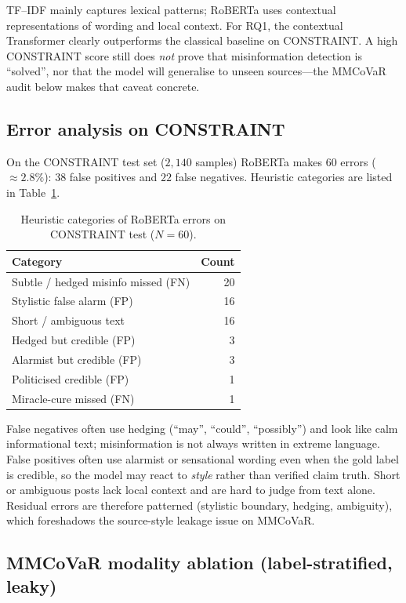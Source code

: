 \documentclass[12pt, a4paper]{report}
\begin{document}
TF--IDF mainly captures lexical patterns; RoBERTa uses contextual representations of wording and local context.
For RQ1, the contextual Transformer clearly outperforms the classical baseline on CONSTRAINT.
A high CONSTRAINT score still does \emph{not} prove that misinformation detection is ``solved'', nor that the model will generalise to unseen sources---the MMCoVaR audit below makes that caveat concrete.

\subsection{Error analysis on CONSTRAINT}

On the CONSTRAINT test set ($2{,}140$ samples) RoBERTa makes $60$ errors ($\approx 2.8\%$): $38$ false positives and $22$ false negatives.
Heuristic categories are listed in Table~\ref{tab:error-cats}.

\begin{table}[htbp]
\centering
\caption{Heuristic categories of RoBERTa errors on CONSTRAINT test ($N=60$).}
\label{tab:error-cats}
\begin{tabular}{lr}
\hline
Category & Count \\
\hline
Subtle / hedged misinfo missed (FN) & 20 \\
Stylistic false alarm (FP) & 16 \\
Short / ambiguous text & 16 \\
Hedged but credible (FP) & 3 \\
Alarmist but credible (FP) & 3 \\
Politicised credible (FP) & 1 \\
Miracle-cure missed (FN) & 1 \\
\hline
\end{tabular}
\end{table}

False negatives often use hedging (``may'', ``could'', ``possibly'') and look like calm informational text; misinformation is not always written in extreme language.
False positives often use alarmist or sensational wording even when the gold label is credible, so the model may react to \emph{style} rather than verified claim truth.
Short or ambiguous posts lack local context and are hard to judge from text alone.
Residual errors are therefore patterned (stylistic boundary, hedging, ambiguity), which foreshadows the source-style leakage issue on MMCoVaR.

\subsection{MMCoVaR modality ablation (label-stratified, leaky)}
\end{document}
